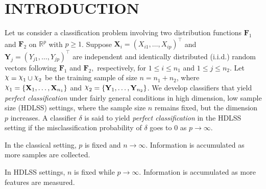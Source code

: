\documentclass[twoside]{article}
\newcommand{\bX}{\mathbf{X}}
\newcommand{\bY}{\mathbf{Y}}
\newcommand{\bF}{\mathbf{F}}
\newcommand{\0}{\mathbf{0}}
\newcommand{\1}{\mathbf{1}}
\DeclareRobustCommand{\rchi}{{\mathpalette\irchi\relax}}
\newcommand{\irchi}[2]{\raisebox{\depth}{$#1\chi$}} %
\numberwithin{equation}{section}
\begin{document}
\section{INTRODUCTION}\label{intro}
Let us consider a classification problem involving two distribution functions $\bF_1$ and $\bF_2$ on $\mathbb{R}^p$ with $p\geq 1$. Suppose $\bX_i=(X_{i1},\ldots, X_{ip})^\top$ and $\bY_j=(Y_{j1},\ldots, Y_{jp})^\top$ are independent and identically distributed (i.i.d.) random vectors following $\bF_1$ and $\bF_2,$ respectively, for $1\le i\le n_1$ and $ 1\le j\le n_2.$ Let $\rchi = \rchi_1\cup \rchi_2$ be the training sample of size $n=n_1+n_2$, where $\rchi_1=\{\bX_{1},\ldots,\bX_{n_1}\}$ and
$\rchi_2=\{\bY_{1},\ldots,\bY_{n_2}\}$. We develop classifiers that yield {\it perfect classification} under fairly general conditions in high dimension, low sample size (HDLSS) settings, where the sample size $n$ remains fixed, but the dimension $p$ increases. A classifier $\delta$ is said to yield {\it perfect classification} in the HDLSS setting if the misclassification probability of $\delta$ goes to 0 as $p\to\infty.$
\begin{tcolorbox}[colback=white]
\noindent In the classical setting, $p$ is fixed and $n\to\infty$. Information is accumulated as more samples are collected.\newline

\noindent In HDLSS settings, $n$ is fixed while $p\to\infty$. Information is accumulated as  more features are measured.
\end{tcolorbox}
\end{document}

